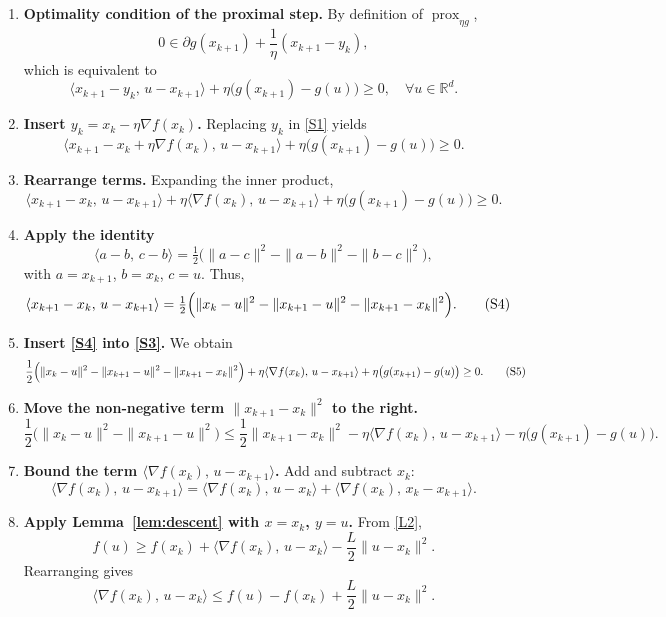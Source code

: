 \documentclass{article}
\begin{document}
\begin{enumerate}[label=[Step \arabic*], leftmargin=*]
\item \textbf{Optimality condition of the proximal step.}  
By definition of $\operatorname{prox}_{\eta g}$,
\[
0\in \partial g(x_{k+1})+\frac{1}{\eta}(x_{k+1}-y_{k}),
\]
which is equivalent to
\[
\langle x_{k+1}-y_{k},\,u-x_{k+1}\rangle+\eta\bigl(g(x_{k+1})-g(u)\bigr)\ge0,
\quad\forall u\in\mathbb{R}^{d}.
\tag{S1}
\]

\item \textbf{Insert $y_{k}=x_{k}-\eta\nabla f(x_{k})$.}  
Replacing $y_{k}$ in \eqref{S1} yields
\[
\langle x_{k+1}-x_{k}+\eta\nabla f(x_{k}),\,u-x_{k+1}\rangle
+\eta\bigl(g(x_{k+1})-g(u)\bigr)\ge0.
\tag{S2}
\]

\item \textbf{Rearrange terms.}  
Expanding the inner product,
\[
\langle x_{k+1}-x_{k},\,u-x_{k+1}\rangle
+\eta\langle\nabla f(x_{k}),\,u-x_{k+1}\rangle
+\eta\bigl(g(x_{k+1})-g(u)\bigr)\ge0.
\tag{S3}
\]

\item \textbf{Apply the identity}
\[
\langle a-b,\,c-b\rangle
= \tfrac12\bigl(\|a-c\|^{2}-\|a-b\|^{2}-\|b-c\|^{2}\bigr),
\]
with $a=x_{k+1}$, $b=x_{k}$, $c=u$.  
Thus,
\[
\langle x_{k+1}-x_{k},\,u-x_{k+1}\rangle
= \tfrac12\Bigl(\|x_{k}-u\|^{2}-\|x_{k+1}-u\|^{2}-\|x_{k+1}-x_{k}\|^{2}\Bigr).
\tag{S4}
\]

\item \textbf{Insert \eqref{S4} into \eqref{S3}.}  
We obtain
\[
\frac12\Bigl(\|x_{k}-u\|^{2}-\|x_{k+1}-u\|^{2}-\|x_{k+1}-x_{k}\|^{2}\Bigr)
+\eta\langle\nabla f(x_{k}),\,u-x_{k+1}\rangle
+\eta\bigl(g(x_{k+1})-g(u)\bigr)\ge0.
\tag{S5}
\]

\item \textbf{Move the non‑negative term $ \|x_{k+1}-x_{k}\|^{2}$ to the right.}
\[
\frac12\bigl(\|x_{k}-u\|^{2}-\|x_{k+1}-u\|^{2}\bigr)
\le \frac12\|x_{k+1}-x_{k}\|^{2}
-\eta\langle\nabla f(x_{k}),\,u-x_{k+1}\rangle
-\eta\bigl(g(x_{k+1})-g(u)\bigr).
\tag{S6}
\]

\item \textbf{Bound the term $\langle\nabla f(x_{k}),\,u-x_{k+1}\rangle$.}  
Add and subtract $x_{k}$:
\[
\langle\nabla f(x_{k}),\,u-x_{k+1}\rangle
= \langle\nabla f(x_{k}),\,u-x_{k}\rangle
+ \langle\nabla f(x_{k}),\,x_{k}-x_{k+1}\rangle .
\tag{S7}
\]

\item \textbf{Apply Lemma~\ref{lem:descent} with $x=x_{k}$, $y=u$.}  
From \eqref{L2},
\[
f(u)\ge f(x_{k})+\langle\nabla f(x_{k}),\,u-x_{k}\rangle
-\frac{L}{2}\|u-x_{k}\|^{2}.
\tag{S8}
\]
Rearranging gives
\[
\langle\nabla f(x_{k}),\,u-x_{k}\rangle
\le f(u)-f(x_{k})+\frac{L}{2}\|u-x_{k}\|^{2}.
\tag{S9}
\]


\end{enumerate}
\end{document}
